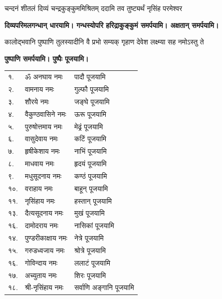\begin{center}
\twolineshloka
{चन्दनं शीतलं दिव्यं चन्द्रकुङ्कुममिश्रितम्}
{ददामि तव तुष्ट्यर्थं नृसिंह परमेश्वर\footnotemark} %


\textbf{\devAya{} दिव्यपरिमलगन्धान् धारयामि। गन्धस्योपरि हरिद्राकुङ्कुमं समर्पयामि। अक्षतान् समर्पयामि।}\medskip


\twolineshloka
{कालोद्भवानि पुष्पाणि तुलस्यादीनि वै प्रभो}
{सम्यक् गृहाण देवेश लक्ष्म्या सह नमोऽस्तु ते\footnotemark} %


\textbf{\devAya{} पुष्पाणि समर्पयामि। पुष्पैः पूजयामि।}

\begin{longtable}{ll@{— }l}
१.&	ॐ अनघाय नमः & पादौ पूजयामि	\\
२.&	वामनाय नमः & गुल्फौ पूजयामि\\
३.&	शौरये नमः & जङ्घे पूजयामि	\\
४.&	वैकुण्ठवासिने नमः & ऊरू पूजयामि	\\
५.&	पुरुषोत्तमाय नमः & मेढ्रं पूजयामि		\\
६.&	वासुदेवाय नमः & कटिं पूजयामि	\\
७.&	हृषीकेशाय नमः & नाभिं पूजयामि\\
८.& माधवाय नमः & हृदयं पूजयामि\\
९.& मधुसूदनाय नमः & कण्ठं पूजयामि\\
१०.&	वराहाय नमः & बाहून् पूजयामि	\\
११.& नृसिंहाय नमः & हस्तान् पूजयामि	\\
१३.& दैत्यसूदनाय नमः & मुखं पूजयामि	\\
१६.& दामोदराय नमः & नासिकां पूजयामि	\\
१४.&	 पुण्डरीकाक्षाय नमः & नेत्रे पूजयामि\\
१५.& गरुडध्वजाय नमः & श्रोत्रे पूजयामि	\\
१६.& गोविन्दाय नमः & ललाटं पूजयामि	\\
१७.& अच्युताय नमः & शिरः पूजयामि\\
१८.& श्री-नृसिंहाय नमः & सर्वाणि अङ्गानि पूजयामि	\\
\end{longtable}


\end{center}
